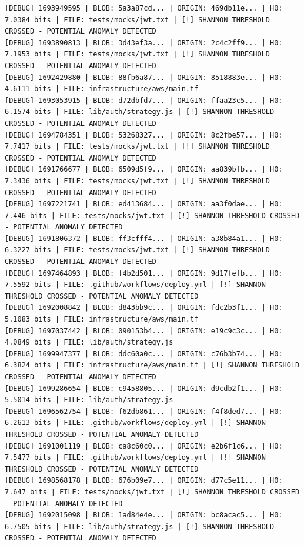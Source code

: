 \documentclass[12pt, a4paper, oneside]{report}
\begin{document}
\begin{lstlisting}[basicstyle=\tiny\ttfamily]
[DEBUG] 1693949595 | BLOB: 5a3a87cd... | ORIGIN: 469db11e... | H0: 7.0384 bits | FILE: tests/mocks/jwt.txt | [!] SHANNON THRESHOLD CROSSED - POTENTIAL ANOMALY DETECTED
[DEBUG] 1693890813 | BLOB: 3d43ef3a... | ORIGIN: 2c4c2ff9... | H0: 7.1953 bits | FILE: tests/mocks/jwt.txt | [!] SHANNON THRESHOLD CROSSED - POTENTIAL ANOMALY DETECTED
[DEBUG] 1692429880 | BLOB: 88fb6a87... | ORIGIN: 8518883e... | H0: 4.6111 bits | FILE: infrastructure/aws/main.tf
[DEBUG] 1693053915 | BLOB: d72dbfd7... | ORIGIN: ffaa23c5... | H0: 6.1574 bits | FILE: lib/auth/strategy.js | [!] SHANNON THRESHOLD CROSSED - POTENTIAL ANOMALY DETECTED
[DEBUG] 1694784351 | BLOB: 53268327... | ORIGIN: 8c2fbe57... | H0: 7.7417 bits | FILE: tests/mocks/jwt.txt | [!] SHANNON THRESHOLD CROSSED - POTENTIAL ANOMALY DETECTED
[DEBUG] 1691766677 | BLOB: 6509d5f9... | ORIGIN: aa839bfb... | H0: 7.3436 bits | FILE: tests/mocks/jwt.txt | [!] SHANNON THRESHOLD CROSSED - POTENTIAL ANOMALY DETECTED
[DEBUG] 1697221741 | BLOB: ed413684... | ORIGIN: aa3f0dae... | H0: 7.446 bits | FILE: tests/mocks/jwt.txt | [!] SHANNON THRESHOLD CROSSED - POTENTIAL ANOMALY DETECTED
[DEBUG] 1691806372 | BLOB: ff3cfff4... | ORIGIN: a38b84a1... | H0: 6.3227 bits | FILE: tests/mocks/jwt.txt | [!] SHANNON THRESHOLD CROSSED - POTENTIAL ANOMALY DETECTED
[DEBUG] 1697464893 | BLOB: f4b2d501... | ORIGIN: 9d17fefb... | H0: 7.5592 bits | FILE: .github/workflows/deploy.yml | [!] SHANNON THRESHOLD CROSSED - POTENTIAL ANOMALY DETECTED
[DEBUG] 1692008842 | BLOB: d843bb9c... | ORIGIN: fdc2b3f1... | H0: 5.1083 bits | FILE: infrastructure/aws/main.tf
[DEBUG] 1697037442 | BLOB: 090153b4... | ORIGIN: e19c9c3c... | H0: 4.0849 bits | FILE: lib/auth/strategy.js
[DEBUG] 1699947377 | BLOB: ddc60a0c... | ORIGIN: c76b3b74... | H0: 6.3824 bits | FILE: infrastructure/aws/main.tf | [!] SHANNON THRESHOLD CROSSED - POTENTIAL ANOMALY DETECTED
[DEBUG] 1699286654 | BLOB: c9458805... | ORIGIN: d9cdb2f1... | H0: 5.5014 bits | FILE: lib/auth/strategy.js
[DEBUG] 1696562754 | BLOB: f62db861... | ORIGIN: f4f8ded7... | H0: 6.2613 bits | FILE: .github/workflows/deploy.yml | [!] SHANNON THRESHOLD CROSSED - POTENTIAL ANOMALY DETECTED
[DEBUG] 1691001119 | BLOB: ca8c60c0... | ORIGIN: e2b6f1c6... | H0: 7.5477 bits | FILE: .github/workflows/deploy.yml | [!] SHANNON THRESHOLD CROSSED - POTENTIAL ANOMALY DETECTED
[DEBUG] 1698568178 | BLOB: 676b09e7... | ORIGIN: d77c5e11... | H0: 7.647 bits | FILE: tests/mocks/jwt.txt | [!] SHANNON THRESHOLD CROSSED - POTENTIAL ANOMALY DETECTED
[DEBUG] 1692015098 | BLOB: 1ad84e4e... | ORIGIN: bc8acac5... | H0: 6.7505 bits | FILE: lib/auth/strategy.js | [!] SHANNON THRESHOLD CROSSED - POTENTIAL ANOMALY DETECTED

\end{lstlisting}
\end{document}
